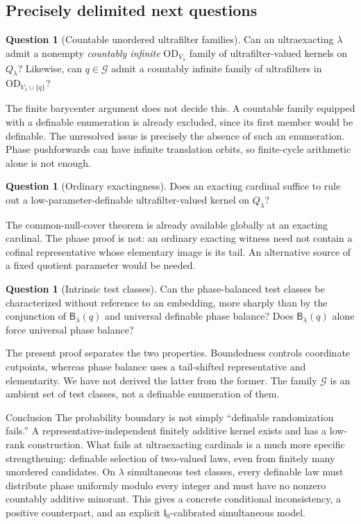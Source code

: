 \documentclass[11pt,letterpaper]{article}
\theoremstyle{definition}
\newtheorem{question}[definition]{Question}
\newcommand{\OD}{\mathrm{OD}}
\newcommand{\Izero}{\mathsf I_0}
\newcommand{\Blam}[1]{\mathsf B_\lambda(#1)}
\newcommand{\ODlam}{\OD_{V_\lambda}}
\newcommand{\ODq}{\OD_{V_\lambda\cup\{q\}}}
\newcommand{\Qlam}{Q_\lambda}
\begin{document}
\subsection{Precisely delimited next questions}

\begin{question}[Countable unordered ultrafilter families]
Can an ultraexacting $\lambda$ admit a nonempty \emph{countably infinite} $\ODlam$ family of ultrafilter-valued kernels on $\Qlam$? Likewise, can $q\in\mathcal G$ admit a countably infinite family of ultrafilters in $\ODq$?
\end{question}

The finite barycenter argument does not decide this. A countable family equipped with a definable enumeration is already excluded, since its first member would be definable. The unresolved issue is precisely the absence of such an enumeration. Phase pushforwards can have infinite translation orbits, so finite-cycle arithmetic alone is not enough.

\begin{question}[Ordinary exactingness]
Does an exacting cardinal suffice to rule out a low-parameter-definable ultrafilter-valued kernel on $\Qlam$?
\end{question}

The common-null-cover theorem is already available globally at an exacting cardinal. The phase proof is not: an ordinary exacting witness need not contain a cofinal representative whose elementary image is its tail. An alternative source of a fixed quotient parameter would be needed.

\begin{question}[Intrinsic test classes]
Can the phase-balanced test classes be characterized without reference to an embedding, more sharply than by the conjunction of $\Blam q$ and universal definable phase balance? Does $\Blam q$ alone force universal phase balance?
\end{question}

The present proof separates the two properties. Boundedness controls coordinate cutpoints, whereas phase balance uses a tail-shifted representative and elementarity. We have not derived the latter from the former. The family $\mathcal G$ is an ambient set of test classes, not a definable enumeration of them.

\begin{assessment}{Conclusion}
The probability boundary is not simply ``definable randomization fails.'' A representative-independent finitely additive kernel exists and has a low-rank construction. What fails at ultraexacting cardinals is a much more specific strengthening: definable selection of two-valued laws, even from finitely many unordered candidates. On $\lambda$ simultaneous test classes, every definable law must distribute phase uniformly modulo every integer and must have no nonzero countably additive minorant. This gives a concrete conditional inconsistency, a positive counterpart, and an explicit $\Izero$-calibrated simultaneous model.
\end{assessment}
\end{document}
